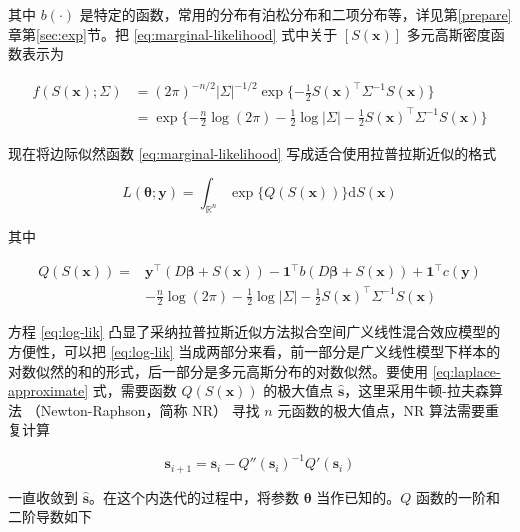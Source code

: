\documentclass[12pt,a4paper,UTF8,twoside]{book}
\theoremstyle{definition}
\theoremstyle{definition}
\theoremstyle{definition}
\theoremstyle{remark}
\begin{document}
\noindent 其中 \(b(\cdot)\) 是特定的函数，常用的分布有泊松分布和二项分布等，详见第\ref{prepare}章第\ref{sec:exp}节。把 \eqref{eq:marginal-likelihood} 式中关于 \([S(\mathbf{x})]\) 多元高斯密度函数表示为

\begin{align}
f(S(\mathbf{x});\Sigma) & = (2\pi)^{-n/2}|\Sigma|^{-1/2} \exp\{ -\frac{1}{2}S(\mathbf{x})^{\top} \Sigma^{-1} S(\mathbf{x}) \} \\
                      & = \exp\{ - \frac{n}{2}\log (2\pi) -\frac{1}{2}\log |\Sigma|  -\frac{1}{2}S(\mathbf{x})^{\top} \Sigma^{-1} S(\mathbf{x}) \} \label{eq:multi-gaussian-dist}
\end{align}

\noindent 现在将边际似然函数 \eqref{eq:marginal-likelihood} 写成适合使用拉普拉斯近似的格式

\begin{equation}
L(\boldsymbol{\theta};\mathbf{y}) = \int_{\mathbb{R}^n} \exp\{Q(S(\mathbf{x}))\} \mathrm{d}S(\mathbf{x}) 
\end{equation}

\noindent 其中

\begin{equation}
\begin{aligned}
Q(S(\mathbf{x})) ={} &  \mathbf{y}^{\top} (D \boldsymbol{\beta} + S(\mathbf{x})) - \mathbf{1}^{\top} b(D \boldsymbol{\beta} + S(\mathbf{x})) + \mathbf{1}^{\top}c(\mathbf{y}) \\
                   & - \frac{n}{2}\log (2\pi) -\frac{1}{2}\log |\Sigma| -\frac{1}{2}S(\mathbf{x})^{\top} \Sigma^{-1} S(\mathbf{x})
\end{aligned} \label{eq:log-lik}
\end{equation}

\noindent 方程 \eqref{eq:log-lik} 凸显了采纳拉普拉斯近似方法拟合空间广义线性混合效应模型的方便性，可以把 \eqref{eq:log-lik} 当成两部分来看，前一部分是广义线性模型下样本的对数似然的和的形式，后一部分是多元高斯分布的对数似然。要使用 \eqref{eq:laplace-approximate} 式，需要函数 \(Q(S(\mathbf{x}))\) 的极大值点 \(\hat{\mathbf{s}}\)，这里采用牛顿-拉夫森算法 （Newton-Raphson，简称 NR） 寻找 \(n\) 元函数的极大值点，NR 算法需要重复计算

\begin{equation}
\mathbf{s}_{i+1} = \mathbf{s}_{i} - Q''(\mathbf{s}_{i})^{-1}Q'(\mathbf{s}_{i}) 
\end{equation}

\noindent 一直收敛到 \(\hat{\mathbf{s}}\)。在这个内迭代的过程中，将参数 \(\boldsymbol{\theta}\) 当作已知的。\(Q\) 函数的一阶和二阶导数如下
\end{document}
